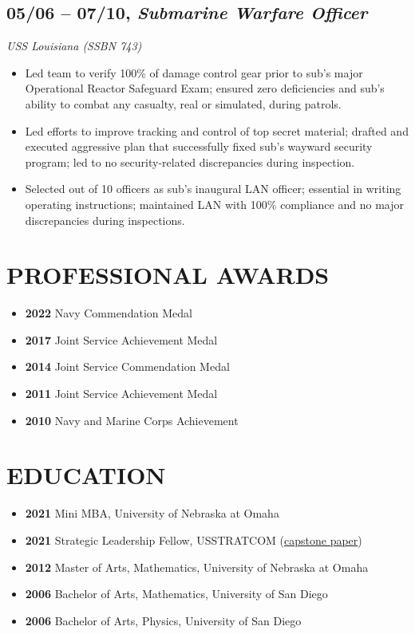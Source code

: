 \documentclass[10pt]{article}
\def\tightlist{}
\begin{document}
\subsection{\texorpdfstring{05/06 -- 07/10, \textbf{\emph{Submarine
Warfare
Officer}}}{05/06 -- 07/10, Submarine Warfare Officer}}\label{submarine-warfare-officer}

\emph{USS Louisiana (SSBN 743)}

\begin{itemize}
\tightlist
\item
  Led team to verify 100\% of damage control gear prior to sub's major
  Operational Reactor Safeguard Exam; ensured zero deficiencies and
  sub's ability to combat any casualty, real or simulated, during
  patrols.
\item
  Led efforts to improve tracking and control of top secret material;
  drafted and executed aggressive plan that successfully fixed sub's
  wayward security program; led to no security-related discrepancies
  during inspection.
\item
  Selected out of 10 officers as sub's inaugural LAN officer; essential
  in writing operating instructions; maintained LAN with 100\%
  compliance and no major discrepancies during inspections.
\end{itemize}

\section{PROFESSIONAL AWARDS}\label{professional-awards}

\begin{itemize}
\tightlist
\item
  \textbf{2022} Navy Commendation Medal
\item
  \textbf{2017} Joint Service Achievement Medal
\item
  \textbf{2014} Joint Service Commendation Medal
\item
  \textbf{2011} Joint Service Achievement Medal
\item
  \textbf{2010} Navy and Marine Corps Achievement
\end{itemize}

\section{EDUCATION}\label{education}

\begin{itemize}
\tightlist
\item
  \textbf{2021} Mini MBA, University of Nebraska at Omaha
\item
  \textbf{2021} Strategic Leadership Fellow, USSTRATCOM
  (\href{https://resume.jasonwohlgemuth.com/SFLP_capstone.pdf}{capstone
  paper})
\item
  \textbf{2012} Master of Arts, Mathematics, University of Nebraska at
  Omaha
\item
  \textbf{2006} Bachelor of Arts, Mathematics, University of San Diego
\item
  \textbf{2006} Bachelor of Arts, Physics, University of San Diego
\end{itemize}
\end{document}
